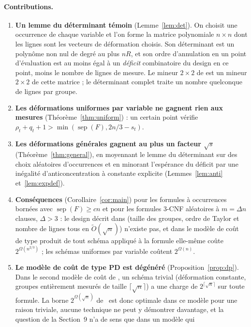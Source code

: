 \documentclass[11pt,a4paper]{article}
\theoremstyle{definition}
\theoremstyle{remark}
\newcommand{\sep}{\operatorname{sep}}
\begin{document}
\paragraph{Contributions.}
\begin{enumerate}
\item \textbf{Un lemme du déterminant témoin} (Lemme~\ref{lem:det}). On choisit une
 occurrence de chaque variable et l'on forme la matrice polynomiale $n\times n$ dont les
 lignes sont les vecteurs de déformation choisis. Son déterminant est un polynôme non nul de
 degré au plus $nR$, et son ordre d'annulation en un point d'évaluation est au moins égal à
 un \emph{déficit} combinatoire du design en ce point, moins le nombre de lignes de mesure.
 Le mineur $2\times2$ de \cite[Section~9]{DL} est un mineur $2\times 2$ de cette matrice ;
 le déterminant complet traite un nombre quelconque de lignes par groupe.
\item \textbf{Les déformations uniformes par variable ne gagnent rien aux mesures}
 (Théorème~\ref{thm:uniform}) : un certain point vérifie
 $\rho_t+q_t+1>\min(\sep(F),2n/3-s_t)$.
\item \textbf{Les déformations générales gagnent au plus un facteur $\sqrt{s}$}
 (Théorème~\ref{thm:general}), en moyennant le lemme du déterminant sur des choix aléatoires
 d'occurrences et en minorant l'espérance du déficit par une inégalité d'anticoncentration à
 constante explicite (Lemmes~\ref{lem:anti} et~\ref{lem:expdef}).
\item \textbf{Conséquences} (Corollaire~\ref{cor:main}) pour les formules à occurrences
 bornées avec $\sep(F)\ge cn$ et pour les formules 3-CNF aléatoires à $m=\Delta n$ clauses,
 $\Delta>3$ : le design décrit dans \cite[Section~9]{DL} (taille des groupes, ordre de
 Taylor et nombre de lignes tous en $\tilde O(\sqrt n)$) n'existe pas, et dans le modèle de
 coût de type produit de \cite[Section~5.2]{DL} tout schéma appliqué à la formule elle-même
 coûte $2^{\Omega(n^{2/3})}$ ; les schémas uniformes par variable coûtent $2^{\Omega(n)}$.
\item \textbf{Le modèle de coût de type PD est dégénéré} (Proposition~\ref{prop:dp}). Dans le
 second modèle de coût de \cite[Section~5.2]{DL}, un schéma trivial (déformation constante,
 groupes entièrement mesurés de taille $\lceil\sqrt n\rceil$) a une charge de
 $2^{\lceil\sqrt n\rceil}$ sur toute formule. La borne $2^{\Omega(\sqrt n)}$ de~\cite{DL}
 est donc optimale dans ce modèle pour une raison triviale, aucune technique ne peut y
 démontrer davantage, et la question de la Section~9 n'a de sens que dans un modèle qui

\end{enumerate}
\end{document}
